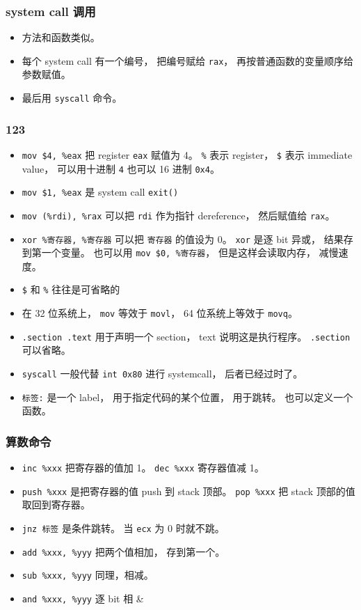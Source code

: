 \subsubsection{system call 调用}
\begin{itemize}
\item 方法和函数类似。
\item 每个 system call 有一个编号， 把编号赋给 \verb|rax|， 再按普通函数的变量顺序给参数赋值。
\item 最后用 \verb|syscall| 命令。
\end{itemize}

\subsubsection{123}
\begin{itemize}
\item \verb|mov $4, %eax| 把 register \verb|eax| 赋值为 4。 \verb|%| 表示 register， \verb|$| 表示 immediate value， 可以用十进制 \verb|4| 也可以 16 进制 \verb|0x4|。
\item \verb|mov $1, %eax| 是 system call \verb|exit()|
\item \verb|mov (%rdi), %rax| 可以把 \verb|rdi| 作为指针 dereference， 然后赋值给 \verb|rax|。
\item \verb|xor %寄存器, %寄存器| 可以把 \verb|寄存器| 的值设为 0。 \verb|xor| 是逐 bit 异或， 结果存到第一个变量。 也可以用 \verb|mov $0, %寄存器|， 但是这样会读取内存， 减慢速度。
\item \verb|$| 和 \verb|%| 往往是可省略的
\item 在 32 位系统上， \verb|mov| 等效于 \verb|movl|， 64 位系统上等效于 \verb|movq|。
\item \verb|.section .text| 用于声明一个 section， text 说明这是执行程序。 \verb|.section| 可以省略。
\item \verb|syscall| 一般代替 \verb|int 0x80| 进行 systemcall， 后者已经过时了。
\item \verb|标签:| 是一个 label， 用于指定代码的某个位置， 用于跳转。 也可以定义一个函数。
\end{itemize}

\subsubsection{算数命令}
\begin{itemize}
\item \verb|inc %xxx| 把寄存器的值加 1。 \verb|dec %xxx| 寄存器值减 1。
\item \verb|push %xxx| 是把寄存器的值 push 到 stack 顶部。 \verb|pop %xxx| 把 stack 顶部的值取回到寄存器。
\item \verb|jnz 标签| 是条件跳转。 当 \verb|ecx| 为 0 时就不跳。
\item \verb|add %xxx, %yyy| 把两个值相加， 存到第一个。
\item \verb|sub %xxx, %yyy| 同理，相减。
\item \verb|and %xxx, %yyy| 逐 bit 相 \&
\end{itemize}

